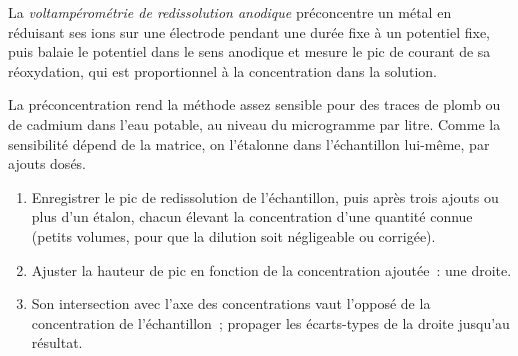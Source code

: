 \begin{definition}\label{def:b3:electrode-kinetics:stripping}
La \emph{voltampérométrie de redissolution anodique}
préconcentre un métal en réduisant ses ions sur une électrode pendant
une durée fixe à un potentiel fixe, puis balaie le potentiel dans le
sens anodique et mesure le pic de courant de sa réoxydation, qui est
proportionnel à la concentration dans la solution.
\end{definition}

La préconcentration rend la méthode assez sensible pour des traces de
plomb ou de cadmium dans l'eau potable, au niveau du microgramme par
litre. Comme la sensibilité dépend de la matrice, on l'étalonne dans
l'échantillon lui-même, par ajouts dosés.

\begin{method}\label{met:b3:electrode-kinetics:standard-addition}
\begin{enumerate}
  \item Enregistrer le pic de redissolution de l'échantillon, puis après
        trois ajouts ou plus d'un étalon, chacun élevant la concentration
        d'une quantité connue (petits volumes, pour que la dilution soit
        négligeable ou corrigée).
  \item Ajuster la hauteur de pic en fonction de la concentration ajoutée~:
        une droite.
  \item Son intersection avec l'axe des concentrations vaut l'opposé de
        la concentration de l'échantillon~; propager les écarts-types de
        la droite jusqu'au résultat.
\end{enumerate}
\end{method}

